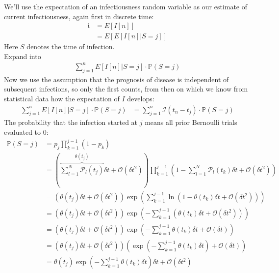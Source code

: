 \documentclass{article}
\begin{document}
We'll use the expectation of an infectiousness random variable as our estimate
of current infectiousness, again first in discrete time:
\begin{align*}
  \mathfrak{i} &= E\left[ I[n] \right]\\
                 &= E\left[ E\left[ I[n] \vert S = j \right] \right]
\end{align*}
Here \(S\) denotes the time of infection.\\
Expand into
\begin{align*}
 \sum_{j=1}^n E\left[ I[n] \vert S = j \right] \cdot \mathbb{P}(S = j)
\end{align*}
Now we use the assumption that the prognosis of disease is independent of
subsequent infections, so only the first counts, from then on which we know from
statistical data how the expectation of \(I\) develops:
\begin{align}
  \sum_{j=1}^n E\left[ I[n] \vert S = j \right] \cdot \mathbb{P}(S = j) &= \sum_{j=1}^n \mathcal{I}\left( t_n-t_j \right) \cdot \mathbb{P}(S = j)
\end{align}
The probability that the infection started at \(j\) means all prior Bernoulli trials evaluated
to \(0\):
\begin{align*}
  \mathbb{P}(S = j) &= p_j \prod_{k=1}^{j-1}(1-p_k)\\
                    &= \left( \overbrace{\sum_{l=1}^N \mathcal{P}_l\left(t_j\right)}^{\theta \left(t_j\right)}\delta t
                      + \mathcal{O}\left(\delta t^2\right)\right)\prod_{k=1}^{j-1} \left( 1-\sum_{l=1}^N\mathcal{P}_l\left( t_k \right)\delta t + \mathcal{O}\left( \delta t^2 \right)\right)\\
                    &= \left( \theta\left( t_j \right) \delta t + \mathcal{O}\left( \delta t^2 \right) \right)
                      \exp \left( \sum_{k=1}^{j-1} \ln \left( 1- \theta\left( t_k \right)\delta t
                      + \mathcal{O}\left(\delta t^2 \right)\right)\right)\\
                    &= \left( \theta\left( t_j \right) \delta t + \mathcal{O}\left( \delta t^2 \right) \right)
                      \exp \left( -\sum_{k=1}^{j-1} \left( \theta\left( t_k \right)\delta t
                      + \mathcal{O}\left(\delta t^2 \right) \right) \right)\\
                    &= \left( \theta\left( t_j \right) \delta t + \mathcal{O}\left( \delta t^2 \right) \right)
                      \exp \left( -\sum_{k=1}^{j-1} \theta\left( t_k \right)\delta t
                      + \mathcal{O}\left(\delta t \right) \right)\\
                    &= \left( \theta\left( t_j \right) \delta t + \mathcal{O}\left( \delta t^2 \right) \right)
                      \left( \exp \left( -\sum_{k=1}^{j-1} \theta\left( t_k \right)\delta t
                      \right)+ \mathcal{O}\left(\delta t \right)  \right)\\
                    &= \theta\left( t_j \right)
                      \exp \left( -\sum_{k=1}^{j-1} \theta\left( t_k \right)\delta t
                      \right)\delta t+  \mathcal{O}\left( \delta t^2\right)
\end{align*}
\end{document}

